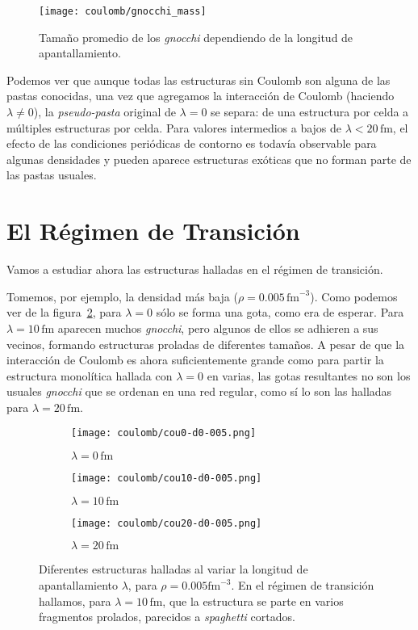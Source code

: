 \begin{figure}[h] %
\centering
\texttt{[image: coulomb/gnocchi\_mass]}
\caption{Tamaño promedio de los \emph{gnocchi} dependiendo de la longitud de apantallamiento.}
\label{fig:gnocchi_mass}
\end{figure}

Podemos ver que aunque todas las estructuras sin Coulomb son alguna de las pastas conocidas, una vez que agregamos la interacción de Coulomb (haciendo $\lambda\neq0$), la \emph{pseudo-pasta} original de $\lambda=0$ se separa: de una estructura por celda a múltiples estructuras por celda.
Para valores intermedios a bajos de $\lambda < 20\,\text{fm}$, el efecto de las condiciones periódicas de contorno es todavía observable para algunas densidades y pueden aparece estructuras exóticas que no forman parte de las pastas usuales.

\section{El Régimen de Transición} \label{transition}

Vamos a estudiar ahora las estructuras halladas en el régimen de transición.

Tomemos, por ejemplo, la densidad más baja ($\rho=0.005\,\text{fm}^{-3}$).
Como podemos ver de la figura~\ref{fig:gnocchi}, para $\lambda=0$ sólo se forma una gota, como era de esperar.
Para $\lambda=10\,\text{fm}$ aparecen muchos \emph{gnocchi}, pero algunos de ellos se adhieren a sus vecinos, formando estructuras proladas de diferentes tamaños.
A pesar de que la interacción de Coulomb es ahora suficientemente grande como para partir la estructura monolítica hallada con $\lambda=0$ en varias, las gotas resultantes no son los usuales \emph{gnocchi} que se ordenan en una red regular, como sí lo son las halladas para $\lambda=20\,\text{fm}$.

\begin{figure}[h!]  \centering
  \begin{subfigure}[h!]{0.3\columnwidth}
    \centering
    \texttt{[image: coulomb/cou0-d0-005.png]}
    \caption{$\lambda=0\,\text{fm}$}
  \end{subfigure}
  \begin{subfigure}[h!]{0.3\columnwidth}
    \centering
    \texttt{[image: coulomb/cou10-d0-005.png]}
    \caption{$\lambda=10\,\text{fm}$}
  \end{subfigure}
  \begin{subfigure}[h!]{0.3\columnwidth}
    \centering
    \texttt{[image: coulomb/cou20-d0-005.png]}
    \caption{$\lambda=20\,\text{fm}$}
  \end{subfigure}
  \caption{Diferentes estructuras halladas al variar la longitud de apantallamiento $\lambda$, para $\rho=0.005\text{fm}^{-3}$.
    En el régimen de transición hallamos, para $\lambda=10\,\text{fm}$, que la estructura se parte en varios fragmentos prolados, parecidos a \emph{spaghetti} cortados.}
  \label{fig:gnocchi}
\end{figure}


